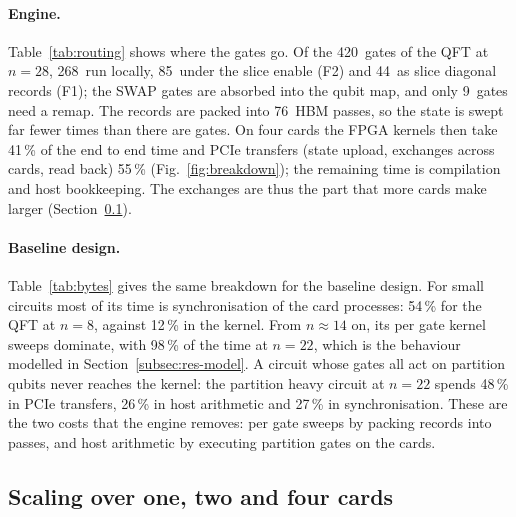 \documentclass[pdflatex,sn-mathphys-num]{sn-jnl}
\newcommand{\NumQftTwentyEightKernelPct}{41}
\newcommand{\NumQftTwentyEightPciePct}{55}
\newcommand{\NumRouteQftExch}{9}
\newcommand{\NumRouteQftFone}{44}
\newcommand{\NumRouteQftFtwo}{85}
\newcommand{\NumRouteQftGates}{420}
\newcommand{\NumRouteQftLocal}{268}
\newcommand{\NumRouteQftPasses}{76}
\newcommand{\NumVsixPhTwentyTwoHostPct}{26}
\newcommand{\NumVsixPhTwentyTwoPciePct}{48}
\newcommand{\NumVsixPhTwentyTwoSyncPct}{27}
\newcommand{\NumVsixQftEightKernelPct}{12}
\newcommand{\NumVsixQftEightSyncPct}{54}
\newcommand{\NumVsixQftTwentyTwoKernelPct}{98}
\theoremstyle{thmstyleone}
\theoremstyle{thmstylethree}
\begin{document}
\paragraph{Engine.} Table~\ref{tab:routing} shows where the gates go. Of the \NumRouteQftGates~gates of the
QFT at $n=28$, \NumRouteQftLocal~run locally, \NumRouteQftFtwo~under the slice enable (F2) and \NumRouteQftFone~as slice
diagonal records (F1); the SWAP gates are absorbed into the qubit map, and only \NumRouteQftExch~gates need a remap. The
records are packed into \NumRouteQftPasses~HBM passes, so the state is swept far fewer times than there are gates. On four
cards the FPGA kernels then take \NumQftTwentyEightKernelPct\,\% of the end to end time and PCIe transfers (state
upload, exchanges across cards, read back) \NumQftTwentyEightPciePct\,\% (Fig.~\ref{fig:breakdown}); the remaining time
is compilation and host bookkeeping. The exchanges are thus the part that more cards make larger
(Section~\ref{subsec:res-scaling}).

\paragraph{Baseline design.} Table~\ref{tab:bytes} gives the same breakdown for the baseline design. For small
circuits most of its time is synchronisation of the card processes: \NumVsixQftEightSyncPct\,\% for the QFT at $n=8$,
against \NumVsixQftEightKernelPct\,\% in the kernel. From $n\approx 14$ on, its per gate kernel sweeps dominate, with
\NumVsixQftTwentyTwoKernelPct\,\% of the time at $n=22$, which is the behaviour modelled in Section~\ref{subsec:res-model}.
A circuit whose gates all act on partition qubits never reaches the kernel: the partition heavy circuit at $n=22$ spends
\NumVsixPhTwentyTwoPciePct\,\% in PCIe transfers, \NumVsixPhTwentyTwoHostPct\,\% in host arithmetic and
\NumVsixPhTwentyTwoSyncPct\,\% in synchronisation. These are the two costs that the engine removes: per gate
sweeps by packing records into passes, and host arithmetic by executing partition gates on the cards.

\subsection{Scaling over one, two and four cards}\label{subsec:res-scaling}
\end{document}
